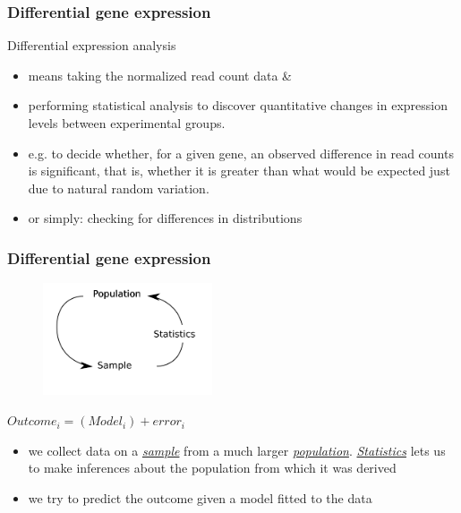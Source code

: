 \documentclass{beamer}\usepackage[]{graphicx}\usepackage[]{color}
\begin{document}
\begin{frame}
\frametitle{Differential gene expression}
Differential expression analysis
\begin{itemize}
\item means taking the normalized read count data \&
\item performing statistical analysis to discover quantitative changes in expression levels between experimental groups. 
\item e.g. to decide whether, for a given gene, an observed difference in read counts is significant, that is, whether it is greater than what would be expected just due to natural random variation.
\item or simply: checking for differences in distributions
\end{itemize}
\end{frame}


\begin{frame}
\frametitle{Differential gene expression}
\begin{center}
\begin{figure}
\includegraphics[width=5cm]{Images/stats.png}
\end{figure}
$Outcome_i=(Model_i)+error_i$
\end{center}
\begin{itemize}
\item we collect data on a \underline{\textit{sample}} from a much larger \underline{\textit{population}}. \underline{\textit{Statistics}} lets us to make inferences about the population from which it was derived
\item we try to predict the outcome given a model fitted to the data
\end{itemize}
\end{frame}
\end{document}
